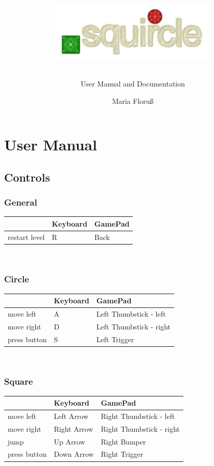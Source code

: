\documentclass[12pt,a4paper]{scrartcl}
\begin{document}
\title{
\begin{figure}[!h]
	\centering
    \includegraphics[width=8cm]{title.pdf}
\end{figure}
}
\subtitle{User Manual and Documentation}
\author{Maria Floru\ss}
\maketitle
\newpage

\section*{User Manual}
\subsection*{Controls}

\subsubsection*{General}
\begin{tabular}{l | p{3cm} | p{6cm} }
 & Keyboard & GamePad\\ \hline
restart level & R & Back\\
\end{tabular}
\\
\subsubsection*{Circle}
\begin{tabular}{l | p{3cm} | p{6cm} }
 & Keyboard & GamePad\\ \hline
move left & A & Left Thumbstick - left\\
move right & D & Left Thumbstick - right\\
press button & S & Left Trigger\\
\end{tabular}
\\
\subsubsection*{Square}
\begin{tabular}{l | p{3cm} | p{6cm} }
 & Keyboard & GamePad\\ \hline
move left & Left Arrow & Right Thumbstick - left\\
move right & Right Arrow & Right Thumbstick - right\\
jump & Up Arrow & Right Bumper\\
press button & Down Arrow & Right Trigger
\end{tabular}
\\
\end{document}
